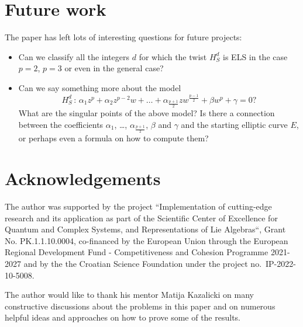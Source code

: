 \documentclass[a4paper, 12pt]{amsart}
\theoremstyle{definition}
\theoremstyle{remark}
\numberwithin{equation}{section}
\begin{document}

\section{Future work}

The paper has left lots of interesting questions for future projects:

\begin{itemize}
    \item Can we classify all the integers $d$ for which the twist $H_S^d$ is ELS in the case $p=2$, $p=3$ or even in the general case?

    \item Can we say something more about the model 
        \[
            H_S^d\,:\, \alpha_{1}z^p+\alpha_2z^{p-2}w+\dotso+\alpha_{\frac{p+1}{2}}zw^{\frac{p-1}{2}}+\beta w^p+\gamma=0 ?
        \]
        What are the singular points of the above model? Is there a connection between the coefficients $\alpha_{1}$, \ldots, $\alpha_{\frac{p+1}{2}}$, $\beta$ and $\gamma$ and the starting elliptic curve $E$, or perhaps even a formula on how to compute them?
    \end{itemize}

\section*{Acknowledgements}

The author was supported by the project “Implementation of cutting-edge research and its application as part of the Scientific Center of Excellence for Quantum and Complex Systems, and Representations of Lie Algebras“, Grant No. PK.1.1.10.0004, co-financed by the European Union through the European Regional Development Fund - Competitiveness and Cohesion Programme 2021-2027 and by the the Croatian Science Foundation under the project no.\ IP-2022-10-5008.

The author would like to thank his mentor Matija Kazalicki on many constructive discussions about the problems in this paper and on numerous helpful ideas and approaches on how to prove some of the results.
    


\end{document}
